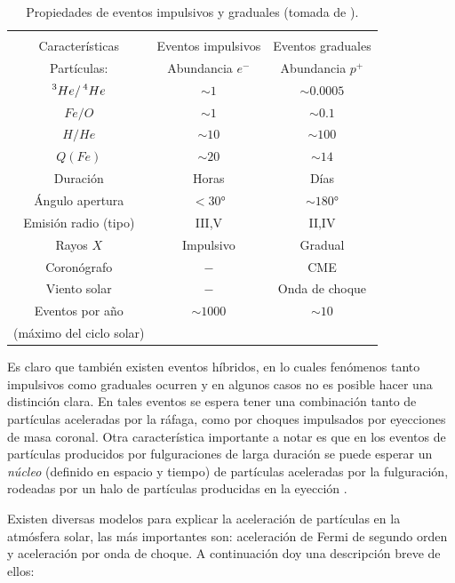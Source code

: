 \begin{table}
\caption{Propiedades de eventos impulsivos y graduales (tomada de \cite{reames96}).}
\label{table:sep}

\begin{tabular}{ccc}
\toprule
\multicolumn{2}{c}{}\\
\cmidrule(r){1-2}
Características & Eventos impulsivos & Eventos graduales\\
\midrule
Partículas: & Abundancia $e^{-}$ & Abundancia $p^{+}$ \\
$\prescript{3}{}{He}/\prescript{4}{}{He}$ & $\sim 1$ & $\sim 0.0005$\\
$Fe/O$ & $\sim 1$ & $\sim 0.1$\\
$H/He$ &$\sim 10$ & $\sim 100$\\
$Q(Fe)$ & $\sim 20$ & $\sim 14$\\
Duración & Horas & Días\\
Ángulo apertura & $< \ang{30}$ & $\sim \ang{180}$\\
Emisión radio (tipo) & III,V & II,IV\\
Rayos $X$ & Impulsivo & Gradual\\
Coronógrafo & $-$ & CME\\
Viento solar & $-$ & Onda de choque\\
Eventos por año & $\sim 1000$ & $\sim 10$\\
(máximo del ciclo solar) & & \\
\bottomrule

\end{tabular}
\end{table}

Es claro que también existen eventos híbridos, en lo cuales fenómenos tanto impulsivos como graduales ocurren y en algunos casos no es posible hacer una distinción clara. En tales eventos se espera tener una combinación tanto de partículas aceleradas por la ráfaga, como por choques impulsados por eyecciones de masa coronal. Otra característica importante a notar es que en los eventos de partículas producidos por fulguraciones de larga duración se puede esperar un \emph{núcleo} (definido en espacio y tiempo) de partículas aceleradas por la fulguración, rodeadas por un halo de partículas producidas en la eyección \cite{cliver96}.

Existen diversas modelos para explicar la aceleración de partículas en la atmósfera solar, las más importantes son: aceleración de Fermi de segundo orden y aceleración por onda de choque. A continuación doy una descripción breve de ellos:

